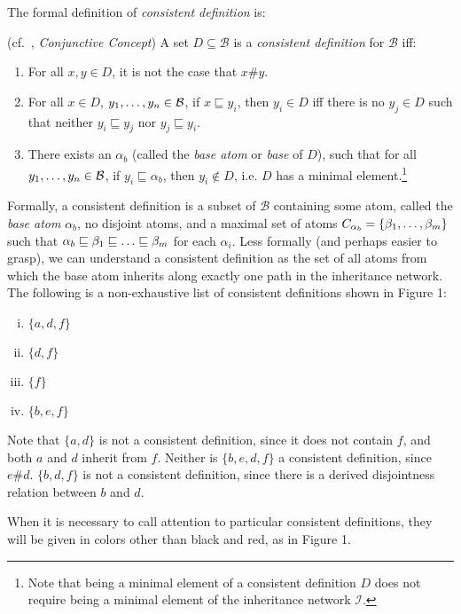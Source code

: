 The formal definition of \emph{consistent definition} is:

(cf.\ \cite{carpenter_inclusion_1991}, \emph{Conjunctive Concept}) A set $D\subseteq\mathcal{B}$ is a \emph{consistent definition} for $\mathcal{B}$ iff:
\begin{enumerate}[(1)]
\item For all $x,y\in D$, it is not the case that $x\#y$.
\item For all $x\in D$, $y_1,\mathellipsis,y_n\in\mathcal{B}$, if $x\sqsubseteq y_i$, then $y_i\in D$ iff there is no $y_j\in D$ such that neither $y_i\sqsubseteq y_j$ nor $y_j\sqsubseteq y_i$.
\item There exists an $\alpha_b$ (called the \emph{base atom} or \emph{base} of $D$), such that for all $y_1,\mathellipsis,y_n\in\mathcal{B}$, if $y_i\sqsubseteq \alpha_b$, then $y_i\notin D$, i.e. $D$ has a minimal element.\footnote{Note that being a minimal element of a consistent definition $D$ does not require being a minimal element of the inheritance network $\mathcal{I}$.}
\end{enumerate}

Formally, a consistent definition is a subset of $\mathcal{B}$ containing some atom, called the \emph{base atom} $\alpha_b$, no disjoint atoms, and a maximal set of atoms $C_{\alpha_b}=\{\beta_1,\mathellipsis,\beta_m\}$ such that $\alpha_b\sqsubseteq\beta_1\sqsubseteq\mathellipsis\sqsubseteq\beta_m$ for each $\alpha_i$. Less formally (and perhaps easier to grasp), we can understand a consistent definition as the set of all atoms from which the base atom inherits along exactly one path in the inheritance network. The following is a non-exhaustive list of consistent definitions shown in Figure 1:
\begin{enumerate}[(i)]
\item $\{a,d,f\}$
\item $\{d,f\}$
\item $\{f\}$
\item $\{b,e,f\}$
\end{enumerate}
Note that $\{a,d\}$ is not a consistent definition, since it does not contain $f$, and both $a$ and $d$ inherit from $f$. Neither is $\{b,e,d,f\}$ a consistent definition, since $e\# d$. $\{b,d,f\}$ is not a consistent definition, since there is a derived disjointness relation between $b$ and $d$.

When it is necessary to call attention to particular consistent definitions, they will be given in colors other than black and red, as in Figure 1.

